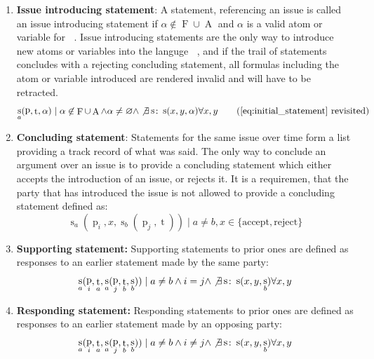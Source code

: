 \documentclass[12pt,msc,a4paper,oneside]{ucl_thesis}
\DeclareMathOperator{\Proplang}{\mathcal{L}(N)}
\DeclareMathOperator{\Propatom}{A}
\DeclareMathOperator{\Propvar}{F}
\DeclareMathOperator{\statement}{s}
\DeclareMathOperator{\statementtext}{t}
\DeclareMathOperator{\party}{p}
\begin{document}
\begin{enumerate}
    
    \item\textbf{Issue introducing statement}: A statement, referencing an issue is called an issue introducing statement if $\alpha \not\in \Propvar \cup \Propatom$ and $\alpha$ is a valid atom or variable for $\Proplang$. Issue introducing statements are the only way to introduce new atoms or variables into the languge $\Proplang$, and if the trail of statements concludes with a rejecting concluding statement, all formulas including the atom or variable introduced are rendered invalid and will have to be retracted.
        \begin{equation*}
    \statement_a(\party, \statementtext, \alpha) \mid \alpha \not\in \Propvar \cup \Propatom \wedge \alpha \neq \varnothing \wedge \not\exists \statement \colon \statement(x, y, \alpha) \forall x,y
            \tag{\ref{eq:initial_statement} revisited}
        \end{equation*}

    \item\textbf{Concluding statement}: Statements for the same issue over time form a list providing a track record of what was said. The only way to conclude an argument over an issue is to provide a concluding statement which either accepts the introduction of an issue, or rejects it. It is a requiremen, that the party that has introduced the issue is not allowed to provide a concluding statement defined as:
        \begin{equation}
            \statement_a(\party_i, x, \statement_b(\party_j, \statementtext)) \mid a \neq b, x \in \{\textrm{accept}, \textrm{reject}\}
        \end{equation}


    \item \textbf{Supporting statement:} Supporting statements to prior ones are defined as responses to an earlier statement made by the same party:
        \begin{equation}
            \statement_a(\party_i, \statementtext_a, \statement_a(\party_j, \statementtext_b, \statement_b)) \mid a \neq b \wedge i = j \wedge \not\exists \statement \colon \statement(x, y, \statement_b) \forall x,y
        \end{equation}

    \item \textbf{Responding statement:} Responding statements to prior ones are defined as responses to an earlier statement made by an opposing party:
        \begin{equation}
            \statement_a(\party_i, \statementtext_a, \statement_a(\party_j, \statementtext_b, \statement_b)) \mid a \neq b \wedge i \neq j \wedge \not\exists \statement \colon \statement(x, y, \statement_b) \forall x,y
        \end{equation}

\end{enumerate}
\end{document}
